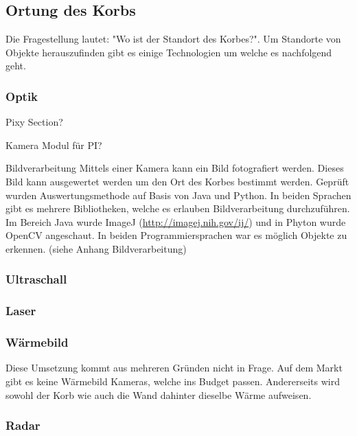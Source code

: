 \subsection{Ortung des Korbs}
Die Fragestellung lautet: "Wo ist der Standort des Korbes?". Um Standorte von Objekte herauszufinden gibt es einige Technologien um welche es nachfolgend geht.

\subsubsection{Optik}

Pixy Section?

Kamera Modul für PI?

Bildverarbeitung
Mittels einer Kamera kann ein Bild fotografiert werden. Dieses Bild kann ausgewertet werden um den Ort des Korbes bestimmt werden. Geprüft wurden Auswertungsmethode auf Basis von Java und Python. In beiden Sprachen gibt es mehrere Bibliotheken, welche es erlauben Bildverarbeitung durchzuführen. Im Bereich Java wurde ImageJ (\href{http://imagej.nih.gov/ij/}{http://imagej.nih.gov/ij/}) und in Phyton wurde OpenCV  angeschaut. In beiden Programmiersprachen war es möglich Objekte zu erkennen. (siehe Anhang Bildverarbeitung)

\subsubsection{Ultraschall}

\subsubsection{Laser}

\subsubsection{Wärmebild}
Diese Umsetzung kommt aus mehreren Gründen nicht in Frage. Auf dem Markt gibt es keine Wärmebild Kameras, welche ins Budget passen. Andererseits wird sowohl der Korb wie auch die Wand dahinter dieselbe Wärme aufweisen.

\subsubsection{Radar}